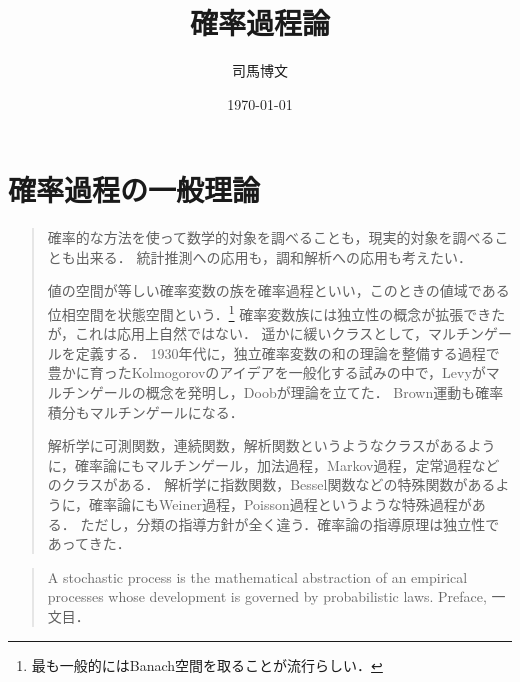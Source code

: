 \documentclass[uplatex,dvipdfmx]{jsreport}
\title{確率過程論}
\author{司馬博文}
\date{\today}
\begin{document}
\tableofcontents

\chapter{確率過程の一般理論}

\begin{quotation}
    確率的な方法を使って数学的対象を調べることも，現実的対象を調べることも出来る．
    統計推測への応用も，調和解析への応用も考えたい．

    値の空間が等しい確率変数の族を確率過程といい，このときの値域である位相空間を状態空間という．\footnote{最も一般的にはBanach空間を取ることが流行らしい．}
    確率変数族には独立性の概念が拡張できたが，これは応用上自然ではない．
    遥かに緩いクラスとして，マルチンゲールを定義する．
    1930年代に，独立確率変数の和の理論を整備する過程で豊かに育ったKolmogorovのアイデアを一般化する試みの中で，Levyがマルチンゲールの概念を発明し，Doobが理論を立てた．
    Brown運動も確率積分もマルチンゲールになる．

    解析学に可測関数，連続関数，解析関数というようなクラスがあるように，確率論にもマルチンゲール，加法過程，Markov過程，定常過程などのクラスがある．
    解析学に指数関数，Bessel関数などの特殊関数があるように，確率論にもWeiner過程，Poisson過程というような特殊過程がある．
    ただし，分類の指導方針が全く違う．確率論の指導原理は独立性であってきた．
\end{quotation}

\begin{quote}
    A stochastic  process is the mathematical abstraction of an empirical processes whose development is governed by probabilistic laws. \cite{Doob} Preface, 一文目．
\end{quote}
\end{document}

